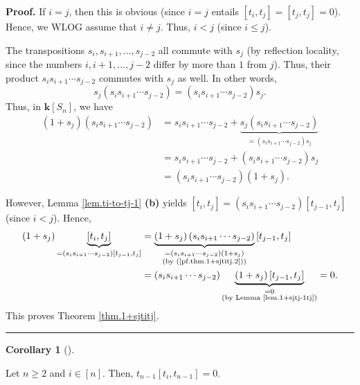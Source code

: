 \documentclass[numbers=enddot,12pt,final,onecolumn,notitlepage]{scrartcl}%
\theoremstyle{definition}
\newtheorem{coro}[theo]{Corollary}
\newenvironment{corollary}[1][]
{\begin{coro}[#1]\begin{leftbar}}
{\end{leftbar}\end{coro}}
\newenvironment{proof}[1][Proof]{\noindent\textbf{#1.} }{\ \rule{0.5em}{0.5em}}
\begin{document}
\begin{proof}
If $i=j$, then this is obvious (since $i=j$ entails $\left[  t_{i}%
,t_{j}\right]  =\left[  t_{j},t_{j}\right]  =0$). Hence, we WLOG assume that
$i\neq j$. Thus, $i<j$ (since $i\leq j$).

The transpositions $s_{i},s_{i+1},\ldots,s_{j-2}$ all commute with $s_{j}$ (by
reflection locality, since the numbers $i,i+1,\ldots,j-2$ differ by more than
$1$ from $j$). Thus, their product $s_{i}s_{i+1}\cdots s_{j-2}$ commutes with
$s_{j}$ as well. In other words,%
\[
s_{j}\left(  s_{i}s_{i+1}\cdots s_{j-2}\right)  =\left(  s_{i}s_{i+1}\cdots
s_{j-2}\right)  s_{j}.
\]
Thus, in $\mathbf{k}\left[  S_{n}\right]  $, we have%
\begin{align}
\left(  1+s_{j}\right)  \left(  s_{i}s_{i+1}\cdots s_{j-2}\right)   &
=s_{i}s_{i+1}\cdots s_{j-2}+\underbrace{s_{j}\left(  s_{i}s_{i+1}\cdots
s_{j-2}\right)  }_{=\left(  s_{i}s_{i+1}\cdots s_{j-2}\right)  s_{j}%
}\nonumber\\
&  =s_{i}s_{i+1}\cdots s_{j-2}+\left(  s_{i}s_{i+1}\cdots s_{j-2}\right)
s_{j}\nonumber\\
&  =\left(  s_{i}s_{i+1}\cdots s_{j-2}\right)  \left(  1+s_{j}\right)  .
\label{pf.thm.1+sjtitj.2}%
\end{align}


However, Lemma \ref{lem.ti-to-tj-1} \textbf{(b)} yields $\left[  t_{i}%
,t_{j}\right]  =\left(  s_{i}s_{i+1}\cdots s_{j-2}\right)  \left[
t_{j-1},t_{j}\right]  $ (since $i<j$). Hence,%
\begin{align*}
\left(  1+s_{j}\right)  \underbrace{\left[  t_{i},t_{j}\right]  }_{=\left(
s_{i}s_{i+1}\cdots s_{j-2}\right)  \left[  t_{j-1},t_{j}\right]  }  &
=\underbrace{\left(  1+s_{j}\right)  \left(  s_{i}s_{i+1}\cdots s_{j-2}%
\right)  }_{\substack{=\left(  s_{i}s_{i+1}\cdots s_{j-2}\right)  \left(
1+s_{j}\right)  \\\text{(by (\ref{pf.thm.1+sjtitj.2}))}}}\left[  t_{j-1}%
,t_{j}\right] \\
&  =\left(  s_{i}s_{i+1}\cdots s_{j-2}\right)  \underbrace{\left(
1+s_{j}\right)  \left[  t_{j-1},t_{j}\right]  }_{\substack{=0\\\text{(by Lemma
\ref{lem.1+sjtj-1tj})}}}=0.
\end{align*}
This proves Theorem \ref{thm.1+sjtitj}.
\end{proof}

\begin{corollary}
\label{cor.tn-1titn-1=0}Let $n\geq2$ and $i\in\left[  n\right]  $. Then,
$t_{n-1}\left[  t_{i},t_{n-1}\right]  =0$.
\end{corollary}
\end{document}
